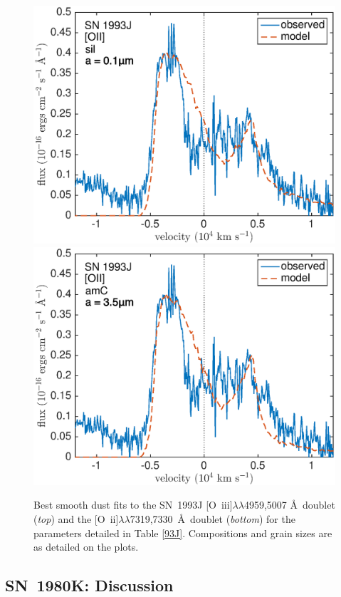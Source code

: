 \begin{figure}[!t]
\includegraphics[scale=0.4,clip=true, trim=0 0 40 20]{chapters/chapter6/figs/93J/smooth/OII}
\includegraphics[scale=0.4,clip=true, trim=30 0 40 20]{chapters/chapter6/figs/93J/smooth/OII_amC}
\caption{Best smooth dust fits to the SN~1993J [O~{\sc iii}]$\lambda\lambda$4959,5007 \AA\ doublet ({\em top}) and the [O~{\sc ii}]$\lambda\lambda$7319,7330~\AA\ doublet ({\em bottom}) for the parameters detailed in Table \ref{93J}.  Compositions and grain sizes are as detailed on the plots.}
\label{93J_smooth}
\end{figure}



\subsection{SN~1980K: Discussion}
\label{scn:discuss}

